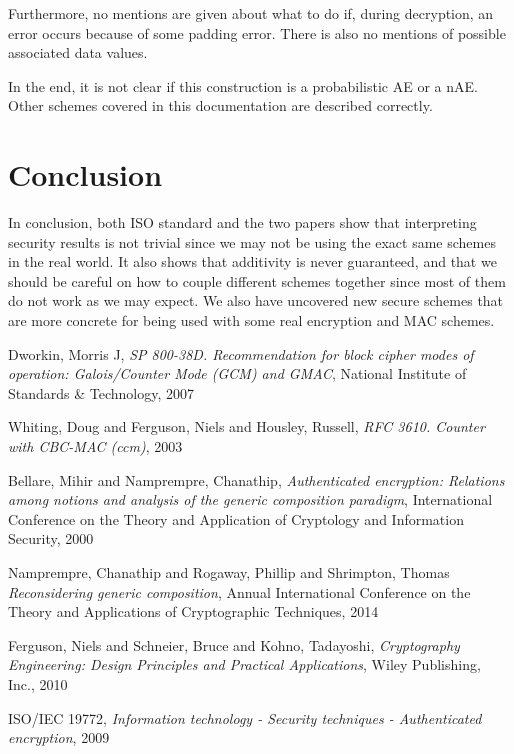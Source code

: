 \documentclass[10pt,a4paper]{article}
\begin{document}
Furthermore, no mentions are given about what to do if, during decryption, an error occurs because of some padding error.
There is also no mentions of possible associated data values.

In the end, it is not clear if this construction is a probabilistic AE or a nAE.
Other schemes covered in this documentation are described correctly.

\section{Conclusion}
In conclusion, both ISO standard and the two papers show that interpreting security results is not trivial since we may not be using the exact same schemes in the real world.
It also shows that additivity is never guaranteed, and that we should be careful on how to couple different schemes together since most of them do not work as we may expect.
We also have uncovered new secure schemes that are more concrete for being used with some real encryption and MAC schemes.

\begin{thebibliography}{9}

	Dworkin, Morris J,
	\emph{SP 800-38D. Recommendation for block cipher modes of operation: Galois/Counter Mode (GCM) and GMAC},
	National Institute of Standards \& Technology,
	2007

	Whiting, Doug and Ferguson, Niels and Housley, Russell,
	\emph{RFC 3610. Counter with CBC-MAC (ccm)},
	2003

	Bellare, Mihir and Namprempre, Chanathip,
	\emph{Authenticated encryption: Relations among notions and analysis of the generic composition paradigm},
	International Conference on the Theory and Application of Cryptology and Information Security,
	2000

	Namprempre, Chanathip and Rogaway, Phillip and Shrimpton, Thomas
	\emph{Reconsidering generic composition},
	Annual International Conference on the Theory and Applications of Cryptographic Techniques,
	2014

	Ferguson, Niels and Schneier, Bruce and Kohno, Tadayoshi,
	\emph{Cryptography Engineering: Design Principles and Practical Applications},
	Wiley Publishing, Inc.,
	2010

	ISO/IEC 19772,
	\emph{Information technology - Security techniques - Authenticated encryption},
	2009

\end{thebibliography}
\end{document}

